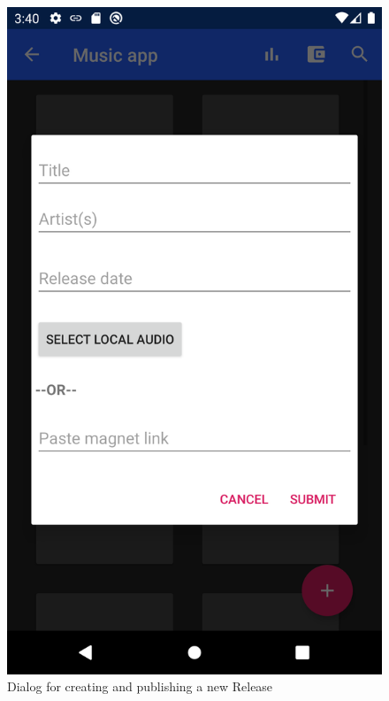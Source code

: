 \begin{figure}
        \includegraphics[width=\linewidth]{implementation/screenshot-select-tracks.png}
        \caption{Dialog for creating and publishing a new Release}
        \label{fig:submit-release-dialog}
    \endminipage\hfill

\end{figure}
